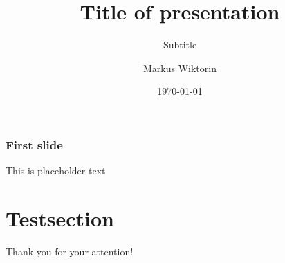 \documentclass{beamer}
\title{Title of presentation}
\subtitle{Subtitle}
\author{Markus Wiktorin}
\date{\today}
\institute{Hochschule Bonn-Rhein-Sieg, University of Applied Science}
\begin{document}
	\maketitle
	\begin{frame}
		\frametitle{First slide}
		This is placeholder text
	\end{frame}
	\section{Testsection}
	\begin{frame}[standout]
		Thank you for your attention!
	\end{frame}
\end{document}

